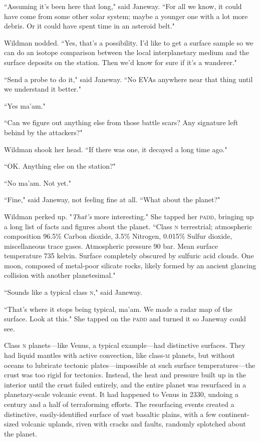 \documentclass[twoside,letterpaper,12pt]{memoir}
\begin{document}
``Assuming it's been here that long," said Janeway. ``For all we know, it could have come from some other solar system; maybe a younger one with a lot more debris. Or it could have spent time in an asteroid belt."

Wildman nodded. ``Yes, that's a possibility. I'd like to get a surface sample so we can do an isotope comparison between the local interplanetary medium and the surface deposits on the station. Then we'd know for sure if it's a wanderer."

``Send a probe to do it," said Janeway. ``No \textsc{EVA}s anywhere near that thing until we understand it better."

``Yes ma'am."

``Can we figure out anything else from those battle scars? Any signature left behind by the attackers?"

Wildman shook her head. ``If there was one, it decayed a long time ago."

``OK. Anything else on the station?"

``No ma'am. Not yet."

``Fine," said Janeway, not feeling fine at all. ``What about the planet?"

Wildman perked up. "\textit{That's} more interesting." She tapped her \textsc{padd}, bringing up a long list of facts and figures about the planet. ``Class \textsc{n} terrestrial; atmospheric composition 96.5\% Carbon dioxide, 3.5\% Nitrogen, 0.015\% Sulfur dioxide, miscellaneous trace gases. Atmospheric pressure 90 bar. Mean surface temperature 735 kelvin. Surface completely obscured by sulfuric acid clouds. One moon, composed of metal-poor silicate rocks, likely formed by an ancient glancing collision with another planetesimal."

``Sounds like a typical class \textsc{n}," said Janeway.

``That's where it stops being typical, ma'am. We made a radar map of the surface. Look at this." She tapped on the \textsc{padd} and turned it so Janeway could see.

Class \textsc{n} planets---like Venus, a typical example---had distinctive surfaces. They had liquid mantles with active convection, like class-\textsc{m} planets, but without oceans to lubricate tectonic plates---impossible at such surface temperatures---the crust was too rigid for tectonics. Instead, the heat and pressure built up in the interior until the crust failed entirely, and the entire planet was resurfaced in a planetary-scale volcanic event. It had happened to Venus in 2330, undoing a century and a half of terraforming efforts. The resurfacing events created a distinctive, easily-identified surface of vast basaltic plains, with a few continent-sized volcanic uplands, riven with cracks and faults, randomly splotched about the planet.
\end{document}
